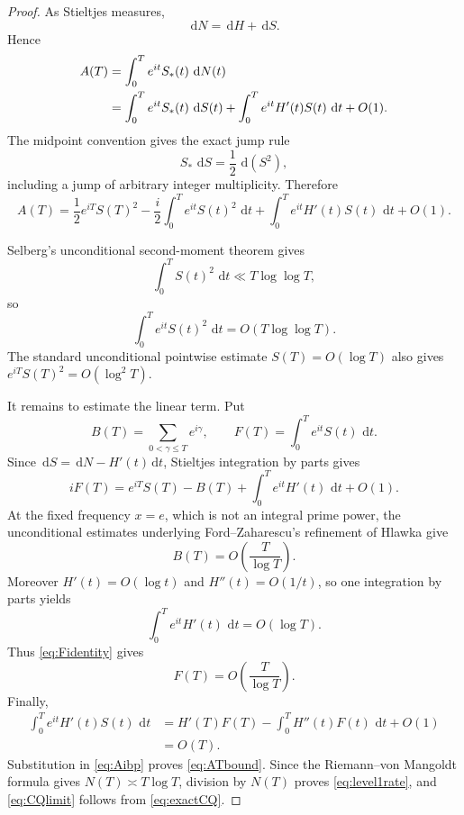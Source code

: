 \documentclass[11pt]{amsart}
\numberwithin{equation}{section}
\theoremstyle{definition}
\theoremstyle{remark}
\newcommand{\dd}{\,\mathrm d}
\begin{document}
\begin{proof}
As Stieltjes measures,
\[
\dd N=\dd H+\dd S.
\]
Hence
\begin{align}
A(T)
&=\int_0^T e^{it}S_*(t)\,\dd N(t)\notag\\
&=\int_0^T e^{it}S_*(t)\,\dd S(t)
 +\int_0^T e^{it}H'(t)S(t)\,\dd t+O(1).
\label{eq:Adecomp}
\end{align}
The midpoint convention gives the exact jump rule
\[
S_*\,\dd S=\frac12\,\dd(S^2),
\]
including a jump of arbitrary integer multiplicity.  Therefore
\begin{equation}\label{eq:Aibp}
A(T)=
\frac12e^{iT}S(T)^2
-\frac{i}{2}\int_0^T e^{it}S(t)^2\,\dd t
+\int_0^T e^{it}H'(t)S(t)\,\dd t
+O(1).
\end{equation}

Selberg's unconditional second-moment theorem gives
\begin{equation}\label{eq:Selberg2}
\int_0^T S(t)^2\,\dd t\ll T\log\log T,
\end{equation}
so
\[
\int_0^T e^{it}S(t)^2\,\dd t=O(T\log\log T).
\]
The standard unconditional pointwise estimate $S(T)=O(\log T)$ also gives $e^{iT}S(T)^2=O(\log^2T)$.

It remains to estimate the linear term.  Put
\[
B(T)=\sum_{0<\gamma\le T}e^{i\gamma},\qquad
F(T)=\int_0^T e^{it}S(t)\,\dd t.
\]
Since $\dd S=\dd N-H'(t)\dd t$, Stieltjes integration by parts gives
\begin{equation}\label{eq:Fidentity}
iF(T)
=e^{iT}S(T)-B(T)+\int_0^T e^{it}H'(t)\,\dd t+O(1).
\end{equation}
At the fixed frequency $x=e$, which is not an integral prime power, the unconditional estimates underlying Ford--Zaharescu's refinement of Hlawka give
\begin{equation}\label{eq:BT}
B(T)=O\!\left(\frac{T}{\log T}\right).
\end{equation}
Moreover $H'(t)=O(\log t)$ and $H''(t)=O(1/t)$, so one integration by parts yields
\[
\int_0^T e^{it}H'(t)\,\dd t=O(\log T).
\]
Thus \eqref{eq:Fidentity} gives
\begin{equation}\label{eq:Fbound}
F(T)=O\!\left(\frac{T}{\log T}\right).
\end{equation}
Finally,
\begin{align}
\int_0^T e^{it}H'(t)S(t)\,\dd t
&=H'(T)F(T)-\int_0^T H''(t)F(t)\,\dd t+O(1)\\
&=O(T).
\end{align}
Substitution in \eqref{eq:Aibp} proves \eqref{eq:ATbound}.  Since the Riemann--von Mangoldt formula gives $N(T)\asymp T\log T$, division by $N(T)$ proves \eqref{eq:level1rate}, and \eqref{eq:CQlimit} follows from \eqref{eq:exactCQ}.
\end{proof}
\end{document}
